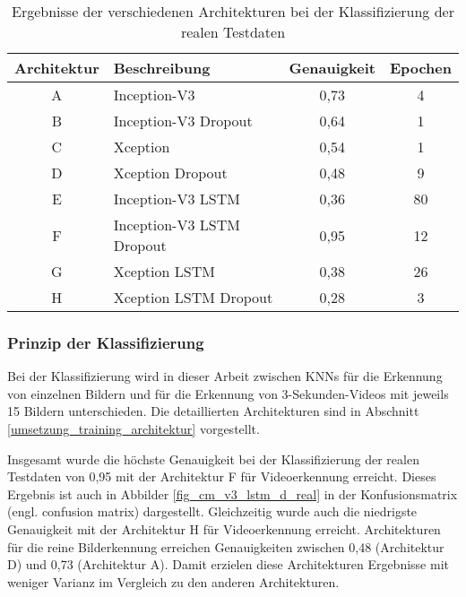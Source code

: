 \begin{table}[h]
\small
\centering
\def\arraystretch{1.4}
\begin{tabular}{c p{3cm} c c}
\textbf{Architektur} & \textbf{Beschreibung} & \textbf{Genauigkeit} & \textbf{Epochen} \\
\hline
A & Inception-V3 & 0,73 & 4 \\
\hline
B & Inception-V3 \newline Dropout & 0,64 & 1 \\
\hline
C & Xception & 0,54 & 1 \\
\hline
D & Xception \newline Dropout & 0,48 & 9 \\
\hline 
E & Inception-V3 \newline LSTM & 0,36 & 80 \\
\hline
F & Inception-V3 \newline LSTM \newline Dropout & 0,95 & 12 \\
\hline
G & Xception \newline LSTM & 0,38 & 26 \\
\hline
H & Xception \newline LSTM \newline Dropout & 0,28 & 3 \\
\hline
\end{tabular}
\caption{Ergebnisse der verschiedenen Architekturen bei der Klassifizierung der realen Testdaten}
\label{tab_ergebnis_real}
\end{table}

\subsubsection{Prinzip der Klassifizierung}

Bei der Klassifizierung wird in dieser Arbeit zwischen \acp{KNN} für die Erkennung von einzelnen Bildern und für die Erkennung von 3-Sekunden-Videos mit jeweils 15 Bildern unterschieden. Die detaillierten Architekturen sind in Abschnitt \ref{umsetzung_training_architektur} vorgestellt.

Insgesamt wurde die höchste Genauigkeit bei der Klassifizierung der realen Testdaten von 0,95 mit der Architektur F für Videoerkennung erreicht. Dieses Ergebnis ist auch in Abbilder \ref{fig_cm_v3_lstm_d_real} in der Konfusionsmatrix (engl. confusion matrix) dargestellt. Gleichzeitig wurde auch die niedrigste Genauigkeit mit der Architektur H für Videoerkennung erreicht. Architekturen für die reine Bilderkennung erreichen Genauigkeiten zwischen 0,48 (Architektur D) und 0,73 (Architektur A). Damit erzielen diese Architekturen Ergebnisse mit weniger Varianz im Vergleich zu den anderen Architekturen.

